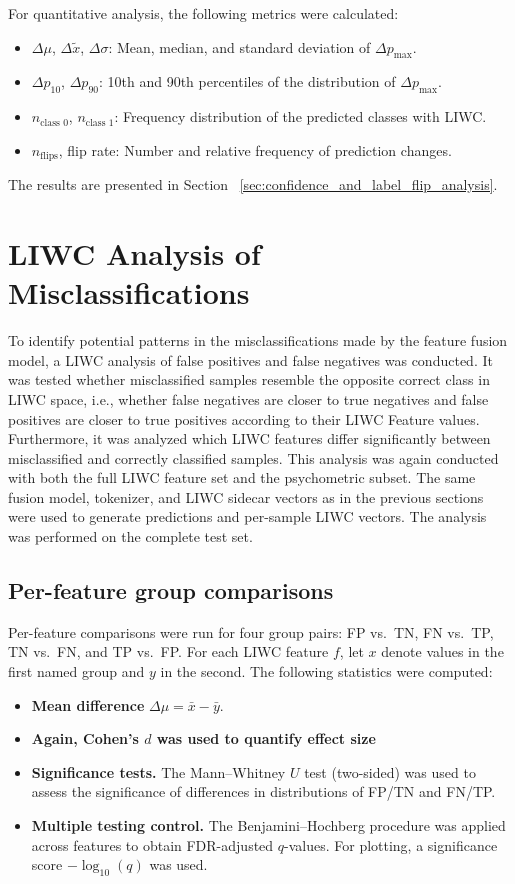 For quantitative analysis, the following metrics were calculated:
\begin{itemize}
    \item $\Delta \mu$, $\Delta \tilde{x}$, $\Delta \sigma$: Mean, median, and standard deviation of \(\Delta p_{\max}\).
    \item $\Delta p_{10}$, $\Delta p_{90}$: 10th and 90th percentiles of the distribution of \(\Delta p_{\max}\).
    \item $n_{\text{class 0}}$, $n_{\text{class 1}}$: Frequency distribution of the predicted classes with LIWC.
    \item $n_{\text{flips}}$, flip rate: Number and relative frequency of prediction changes.
\end{itemize}


The results are presented in Section ~\ref{sec:confidence_and_label_flip_analysis}.

\section{LIWC Analysis of Misclassifications}

To identify potential patterns in the misclassifications made by the feature fusion model, a LIWC analysis of false positives and false negatives was conducted. It was tested whether misclassified samples resemble the opposite correct class in LIWC space, i.e., whether false negatives are closer to true negatives and false positives are closer to true positives according to their LIWC Feature values. Furthermore, it was analyzed which LIWC features differ significantly between misclassified and correctly classified samples. This analysis was again conducted with both the full LIWC feature set and the psychometric subset. The same fusion model, tokenizer, and LIWC sidecar vectors as in the previous sections were used to generate predictions and per-sample LIWC vectors. The analysis was performed on the complete test set.

\subsection{Per-feature group comparisons}
Per-feature comparisons were run for four group pairs: FP vs.\ TN, FN vs.\ TP, TN vs.\ FN, and TP vs.\ FP. For each LIWC feature \(f\), let \(x\) denote values in the first named group and \(y\) in the second. The following statistics were computed:

\begin{itemize}
\item \textbf{Mean difference} \(\Delta\mu = \bar{x} - \bar{y}\).
\item \textbf{Again, Cohen's \(d\)  was used to quantify effect size}
\item \textbf{Significance tests.} The Mann–Whitney \(U\) test (two-sided) was used to assess the significance of differences in distributions of FP/TN and FN/TP.
\item \textbf{Multiple testing control.} The Benjamini–Hochberg procedure was applied across features to obtain FDR-adjusted \(q\)-values. For plotting, a significance score \(-\log_{10}(q)\) was used.
\end{itemize}


